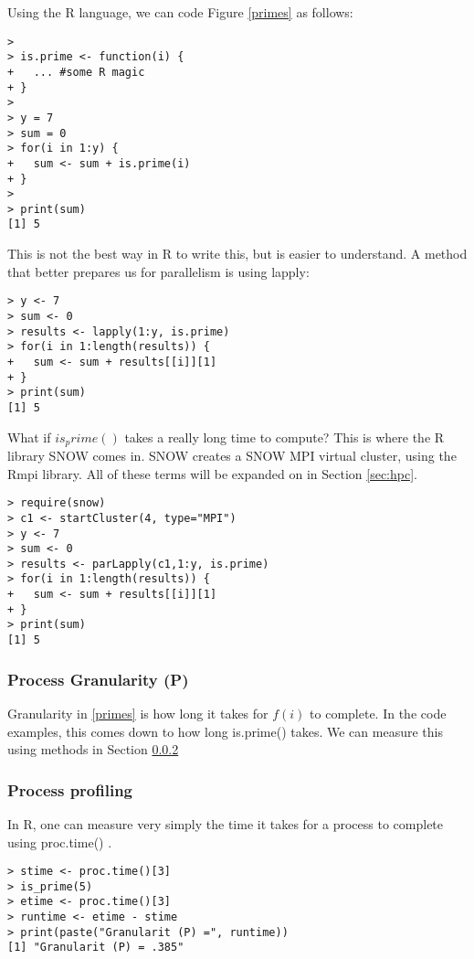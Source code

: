Using the R language, we can code Figure \ref{primes} as follows:
\scriptsize
\begin{lstlisting}
> 
> is.prime <- function(i) {
+ 	... #some R magic
+ }
> 
> y = 7
> sum = 0
> for(i in 1:y) {
+ 	sum <- sum + is.prime(i)
+ }
> 
> print(sum)
[1] 5
\end{lstlisting}
\normalsize

This is not the best way in R to write this, but is easier to understand. A method that better prepares us for
parallelism is using lapply:

\scriptsize
\begin{lstlisting}
> y <- 7
> sum <- 0
> results <- lapply(1:y, is.prime)
> for(i in 1:length(results)) {
+ 	sum <- sum + results[[i]][1]
+ }
> print(sum)
[1] 5
\end{lstlisting}
\normalsize

What if $is_prime()$ takes a really long time to compute? This is where the R library SNOW comes in. SNOW
creates a SNOW MPI virtual cluster, using the Rmpi library. All of these terms will be expanded on in Section
\ref{sec:hpc}.

\scriptsize
\begin{lstlisting}
> require(snow)
> c1 <- startCluster(4, type="MPI")
> y <- 7
> sum <- 0
> results <- parLapply(c1,1:y, is.prime)
> for(i in 1:length(results)) {
+ 	sum <- sum + results[[i]][1]
+ }
> print(sum)
[1] 5
\end{lstlisting}
\normalsize


\subsubsection{Process Granularity (P)}
Granularity in \ref{primes} is how long it takes for $f(i)$ to complete. In the code examples, this comes down
to how long is.prime() takes. We can measure this using methods in Section \ref{sec:proc_prof}

\subsubsection{Process profiling}
\label{sec:proc_prof}
In R, one can measure very simply the time it takes for a process to complete using proc.time() .

\scriptsize
\begin{lstlisting}
> stime <- proc.time()[3]
> is_prime(5)
> etime <- proc.time()[3]
> runtime <- etime - stime
> print(paste("Granularit (P) =", runtime))
[1] "Granularit (P) = .385"
\end{lstlisting}
\normalsize


